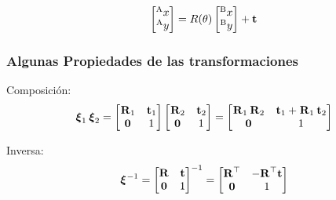 \begin{frame}
    \begin{equation*}
        \begin{bmatrix}
            \toCoord{x}{A}\\
            \toCoord{y}{A}\\
        \end{bmatrix} = R(\theta )
        \begin{bmatrix}
            \toCoord{x}{B}\\
            \toCoord{y}{B}
       \end{bmatrix} + \translation
    \end{equation*}
\end{frame}


\begin{frame}
    \frametitle{Algunas Propiedades de las transformaciones}

	Composición:
    \begin{equation*}
        \transform{}{1}\transform{}{2} =
        \begin{bmatrix}
            \rotationCoord{}{1} & \translationCoord{}{1}\\
            \vec{0} & 1
        \end{bmatrix}
        \begin{bmatrix}
            \rotationCoord{}{2} & \translationCoord{}{2}\\
            \vec{0} & 1
        \end{bmatrix} =
        \begin{bmatrix}
            \rotationCoord{}{1}\rotationCoord{}{2} & \translationCoord{}{1}+\rotationCoord{}{1}\translationCoord{}{2}\\
            \vec{0} & 1
        \end{bmatrix}
    \end{equation*}

	Inversa:
    \begin{equation*}
        \transform{}{}^{-1}=
        \begin{bmatrix}
            \rotation & \translation\\
            \vec{0} & 1
        \end{bmatrix}^{-1} =
        \begin{bmatrix}
            \rotation^{\top} & -\rotation^{\top}\translation\\
            \vec{0} & 1
        \end{bmatrix}
    \end{equation*}

\end{frame}


